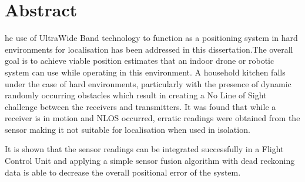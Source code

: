 %
%
%

\chapter*{Abstract}
\begin{SingleSpace}
he use of UltraWide Band technology to function as a positioning system in hard environments for localisation has been addressed in this dissertation.The overall goal is to achieve viable position estimates that an indoor drone or robotic system can use while operating in this environment.
    A household kitchen falls under the case of hard environments, particularly with the presence of dynamic randomly occurring obstacles which result in creating a No Line of Sight challenge between the receivers and transmitters.
    It was found that while a receiver is in motion and NLOS occurred, erratic readings were obtained from the sensor making it not suitable for localisation when used in isolation.
    
    It is shown that the sensor readings can be integrated successfully in a Flight Control Unit and applying a simple sensor fusion algorithm with dead reckoning data is able to decrease the overall positional error of the system.
\end{SingleSpace}
\clearpage